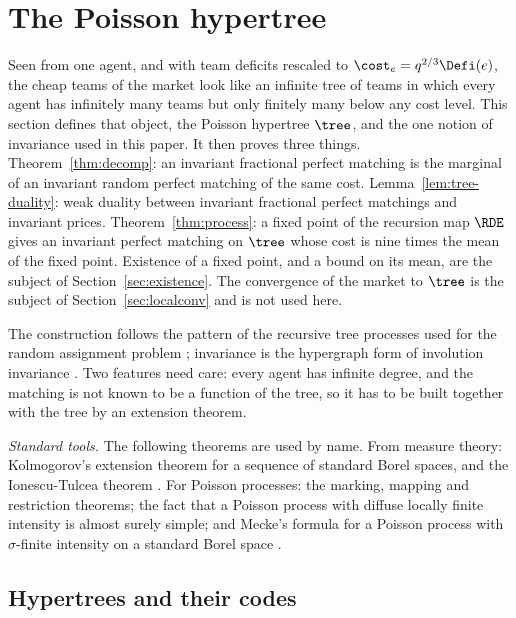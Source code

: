 \section{The Poisson hypertree}\label{sec:tree}

Seen from one agent, and with team deficits rescaled to $\cost_e=q^{2/3}\Defi(e)$, the cheap
teams of the market look like an infinite tree of teams in which every agent has infinitely
many teams but only finitely many below any cost level. This section defines that object,
the Poisson hypertree $\tree$, and the one notion of invariance used in this paper. It then
proves three things. Theorem~\ref{thm:decomp}: an invariant fractional perfect matching is
the marginal of an invariant random perfect matching of the same cost.
Lemma~\ref{lem:tree-duality}: weak duality between invariant fractional perfect matchings
and invariant prices. Theorem~\ref{thm:process}: a fixed point of the recursion map $\RDE$
gives an invariant perfect matching on $\tree$ whose cost is nine times the mean of the fixed
point. Existence of a fixed point, and a bound on its mean, are the subject of
Section~\ref{sec:existence}. The convergence of the market to $\tree$ is the subject of
Section~\ref{sec:localconv} and is not used here.

The construction follows the pattern of the recursive tree processes used for the random
assignment problem \cite{Aldous92,Aldous01,AldousSteele04}; invariance is the hypergraph
form of involution invariance \cite{AldousLyons07}. Two features need care: every agent has
infinite degree, and the matching is not known to be a function of the tree, so it has to be
built together with the tree by an extension theorem.

\emph{Standard tools.} The following theorems are used by name. From measure theory:
Kolmogorov's extension theorem for a sequence of standard Borel spaces, and the
Ionescu-Tulcea theorem \cite{Kallenberg21}. For Poisson processes: the
marking, mapping and restriction theorems; the fact that a Poisson process with diffuse
locally finite intensity is almost surely simple; and Mecke's formula for a Poisson process
with $\sigma$-finite intensity on a standard Borel space \cite{LastPenrose17}.

\subsection{Hypertrees and their codes}\label{subsec:tree-codes}

